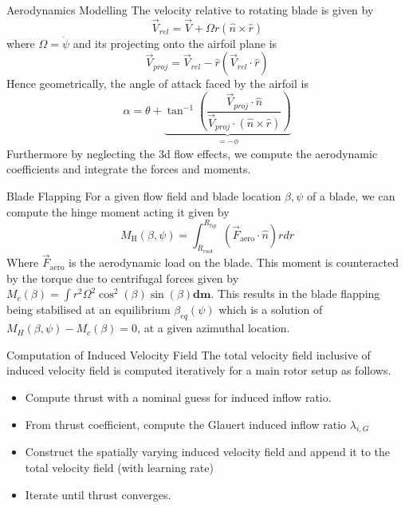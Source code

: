 \begin{frame}{Aerodynamics Modelling}
   The velocity relative to rotating blade is given by 
   \begin{equation*}
\vec{V}_{rel} = \vec{V} + \Omega r (\hat{n} \times \hat{r})
   \end{equation*}
   where $\Omega = \dot{\psi}$ and its projecting onto the airfoil plane is
   \begin{equation*}
       \vec{V}_{proj} = \vec{V}_{rel} - \hat{r}(\vec{V}_{rel}\cdot \hat{r})
   \end{equation*}
   Hence geometrically, the angle of attack faced by the airfoil is  
   \begin{equation*}
       \alpha = \theta + \underbrace{\tan^{-1}\left(\frac{\vec{V}_{proj}\cdot \hat{n}}{\vec{V}_{proj}\cdot (\hat{n}\times \hat{r})}\right)}_{ = - \phi}
   \end{equation*}
   Furthermore by neglecting the 3d flow effects, we compute the aerodynamic coefficients and integrate the forces and moments.
\end{frame}
\begin{frame}{Blade Flapping}
    For a given flow field and blade location $\beta,\psi$ of a blade, we can compute the hinge moment acting it given by
    $$M_{\text{H}}(\beta,\psi) =\int_{R_{root}}^{R_{tip}}(\vec{F}_{\text{aero}}\cdot \hat{n}) r dr$$
    Where $\vec{F}_{\text{aero}}$ is the aerodynamic load on the blade. This moment is counteracted by the torque due to centrifugal forces given by $M_{c}(\beta) = \int r^2 \Omega^2 \cos^2(\beta)\sin(\beta)\mathbf{dm}$. This results in the blade flapping being stabilised at an equilibrium $\beta_{eq}(\psi)$  which is a solution of $M_H(\beta,\psi) - M_c(\beta) =0$, at a given azimuthal location. 
\end{frame}
\begin{frame}{Computation of Induced Velocity Field}
    The total velocity field inclusive of induced velocity field is computed iteratively for a main rotor setup as follows.
    \begin{itemize}
        \item Compute thrust with a nominal guess for induced inflow ratio.
        \item From thrust coefficient, compute the Glauert induced inflow ratio $\lambda_{i,G}$
        \item Construct the spatially varying induced velocity field and append it to the total velocity field (with learning rate)
        \item Iterate until thrust converges.
    \end{itemize}
\end{frame}
%